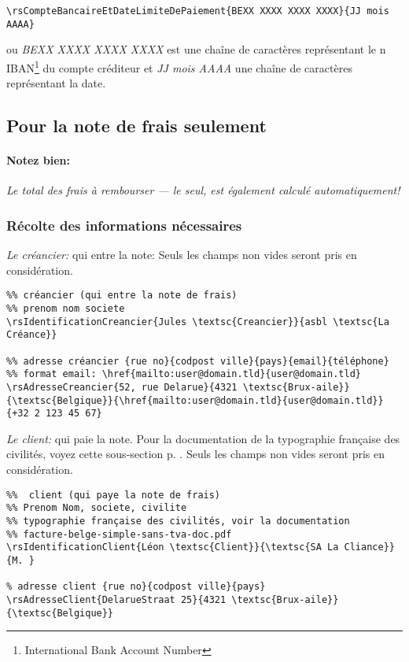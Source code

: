 \documentclass[a4paper,10pt]{article}
\begin{document}
\begin{lstlisting}
\rsCompteBancaireEtDateLimiteDePaiement{BEXX XXXX XXXX XXXX}{JJ mois AAAA}
\end{lstlisting}
ou \emph{BEXX XXXX XXXX XXXX} est une chaîne de caractères représentant le n \textsc{IBAN}\footnote{International Bank Account Number} du compte créditeur et \emph{JJ mois AAAA} une chaîne de caractères représentant la date.



\subsection{Pour la note de frais seulement}

\paragraph{Notez bien:} \emph{Le total des frais à rembourser --- le seul, est également calculé automatiquement!}

\subsubsection{Récolte des informations nécessaires} 

\emph{Le créancier:} qui entre la note:
Seuls les champs non vides seront pris en considération.
\begin{lstlisting}
%% créancier (qui entre la note de frais)
%% prenom nom societe 
\rsIdentificationCreancier{Jules \textsc{Creancier}}{asbl \textsc{La Créance}}

%% adresse créancier {rue no}{codpost ville}{pays}{email}{téléphone}
%% format email: \href{mailto:user@domain.tld}{user@domain.tld}
\rsAdresseCreancier{52, rue Delarue}{4321 \textsc{Brux-aile}}{\textsc{Belgique}}{\href{mailto:user@domain.tld}{user@domain.tld}}{+32 2 123 45 67}
\end{lstlisting}


\emph{Le client:} qui paie la note.
Pour la documentation de la typographie française des civilités, voyez cette sous-section p. \pageref{sub:abreviations_civilites}. Seuls les champs non vides seront pris en considération.
\begin{lstlisting}
%%  client (qui paye la note de frais)
%% Prenom Nom, societe, civilite
%% typographie française des civilités, voir la documentation 
%% facture-belge-simple-sans-tva-doc.pdf 
\rsIdentificationClient{Léon \textsc{Client}}{\textsc{SA La Cliance}}{M. }

% adresse client {rue no}{codpost ville}{pays}
\rsAdresseClient{DelarueStraat 25}{4321 \textsc{Brux-aile}}{\textsc{Belgique}}
\end{lstlisting}
\end{document}
